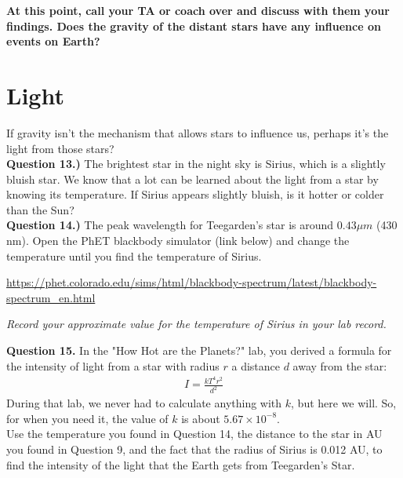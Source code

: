 \documentclass[11pt]{article}
\begin{document}
\bf At this point, call your TA or coach over and discuss with them your findings. Does the gravity of the distant stars have any influence on events on Earth?

\rm 

\newpage

\section{Light}
If gravity isn't the mechanism that allows stars to influence us, perhaps it's the light from those stars?\\

\textbf{Question 13.)} The brightest star in the night sky is Sirius, which is a slightly bluish star. We know that a lot can be learned about the light from a star by knowing its temperature. If Sirius appears slightly bluish, is it hotter or colder than the Sun?\\
%

\textbf{Question 14.)} The peak wavelength for Teegarden's star is around $0.43\mu m$ (430 nm). Open the PhET blackbody simulator (link below) and change the temperature until you find the temperature of Sirius.

\begin{center}\small
	\url{https://phet.colorado.edu/sims/html/blackbody-spectrum/latest/blackbody-spectrum_en.html}
\end{center}
%

\vspace{1em}

{\it Record your approximate value for the temperature of Sirius in your lab record.}
\vspace{2em}

\textbf{Question 15.} In the "How Hot are the Planets?" lab, you derived a formula for the intensity of light from a star with radius $r$ a distance $d$ away from the star:
\begin{align*}
I=\frac{k T^4r^2}{d^2}
\end{align*} 
During that lab, we never had to calculate anything with $k$, but here we will. So, for when you need it, the value of $k$ is about $5.67\times 10^{-8}$.\\

Use the temperature you found in Question 14, the distance to the star in AU you found in Question 9, and the fact that the radius of Sirius is 0.012 AU, to find the intensity of the light that the Earth gets from Teegarden's Star.\\
%
\end{document}
